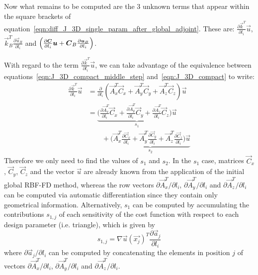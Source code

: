 
Now what remains to be computed are the $3$ unknown terms that appear within the square brackets of equation~\eqref{eqn:diff_J_3D_single_param_after_global_adjoint}. These are: $\frac{\partial \vec{k}^T}{\partial l_i}\vec{u}$, $\vec{k}_B^T \frac{\partial \vec{u}_B}{\partial l_i}$ and $\Bigl( \frac{\partial \vec{C}}{\partial l_i}\vec{u} + \vec{C}_B\frac{\partial \vec{u}_B}{\partial l_i} \Bigr)$.

\medskip
With regard to the term $\frac{\partial \vec{k}^T}{\partial l_i}\vec{u}$, we can take advantage of the equivalence between equations~\eqref{eqn:J_3D_compact_middle_step} and~\eqref{eqn:J_3D_compact} to write:
\begin{equation}
	\begin{split}
		\frac{\partial \vec{k}^T}{\partial l_i}\vec{u} & = \frac{\partial}{\partial l_i} (\vec{A}_x^T\vec{C}_x + \vec{A}_y^T\vec{C}_y + \vec{A}_z^T\vec{C}_z) \vec{u}  \\
													   & = \underbrace{\biggl( \frac{\partial \vec{A}_x^T}{\partial l_i}\vec{C}_x + \frac{\partial \vec{A}_y^T}{\partial l_i}\vec{C}_y + \frac{\partial \vec{A}_z^T}{\partial l_i}\vec{C}_z \biggr) \vec{u}}_{s_1}  \\
													   &\qquad + \underbrace{\biggl( \vec{A}_x^T\frac{\partial \vec{C}_x}{\partial l_i} + \vec{A}_y^T\frac{\partial \vec{C}_y}{\partial l_i} + \vec{A}_z^T\frac{\partial \vec{C}_z}{\partial l_i}\biggr) \vec{u}}_{s_2}
	\end{split}
\end{equation}
Therefore we only need to find the values of $s_1$ and $s_2$.
In the $s_1$ case, matrices $\vec{C}_x$, $\vec{C}_y$, $\vec{C}_z$ and the vector $\vec{u}$ are already known from the application of the initial global RBF-FD method, whereas the row vectors $\partial \vec{A}_x^T / \partial l_i$, $\partial \vec{A}_y^T / \partial l_i$ and $\partial \vec{A}_z^T / \partial l_i$ can be computed via automatic differentiation since they contain only geometrical information.
Alternatively, $s_1$ can be computed by accumulating the contributions $s_{1,j}$ of each sensitivity of the cost function with respect to each design parameter (i.e. triangle), which is given by
\begin{equation}
	s_{1,j} = \nabla\vec{u}(\vec{x_j})^T \frac{\partial \vec{a}_j}{\partial l_i}	
\end{equation}
where $\partial \vec{a}_j / \partial l_i$ can be computed by concatenating the elements in position $j$ of vectors $\partial \vec{A}_x^T / \partial l_i$, $\partial \vec{A}_y^T / \partial l_i$ and $\partial \vec{A}_z^T / \partial l_i$.

